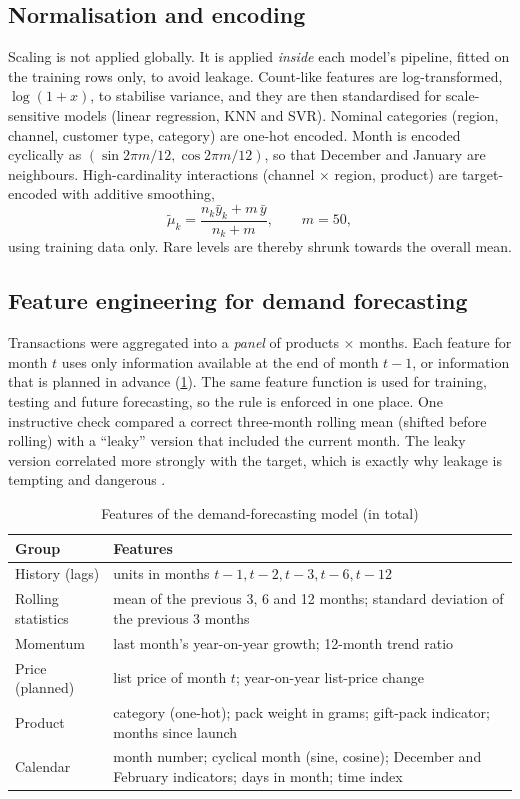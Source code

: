 \subsection{Normalisation and encoding}
Scaling is not applied globally. It is applied \emph{inside} each model's pipeline, fitted on the training rows
only, to avoid leakage. Count-like features are log-transformed, $\log(1+x)$, to stabilise variance, and they
are then standardised for scale-sensitive models (linear regression, KNN and SVR). Nominal categories (region,
channel, customer type, category) are one-hot encoded. Month is encoded cyclically as
$(\sin 2\pi m/12, \cos 2\pi m/12)$, so that December and January are neighbours. High-cardinality interactions
(channel $\times$ region, product) are target-encoded with additive smoothing,
\[
  \tilde\mu_k = \frac{n_k \bar y_k + m\,\bar y}{n_k + m}, \qquad m=50,
\]
using training data only. Rare levels are thereby shrunk towards the overall mean.

\subsection{Feature engineering for demand forecasting}
Transactions were aggregated into a \emph{panel} of \PanelSeries products $\times$ months. Each feature for
month $t$ uses only information available at the end of month $t-1$, or information that is planned in advance
(\cref{tab:features}). The same feature function is used for training, testing and future forecasting, so the
rule is enforced in one place. One instructive check compared a correct three-month rolling mean (shifted
before rolling) with a ``leaky'' version that included the current month. The leaky version correlated more
strongly with the target, which is exactly why leakage is tempting and dangerous \citep{kaufman2012}.

\begin{table}[htbp]\centering\small
\caption{Features of the demand-forecasting model (\PanelFeatures in total)}\label{tab:features}
\begin{tabularx}{\linewidth}{@{}lX@{}}
\toprule
\textbf{Group} & \textbf{Features} \\ \midrule
History (lags) & units in months $t-1, t-2, t-3, t-6, t-12$ \\
Rolling statistics & mean of the previous 3, 6 and 12 months; standard deviation of the previous 3 months \\
Momentum & last month's year-on-year growth; 12-month trend ratio \\
Price (planned) & list price of month $t$; year-on-year list-price change \\
Product & category (one-hot); pack weight in grams; gift-pack indicator; months since launch \\
Calendar & month number; cyclical month (sine, cosine); December and February indicators; days in month; time index \\ \bottomrule
\end{tabularx}
\end{table}

